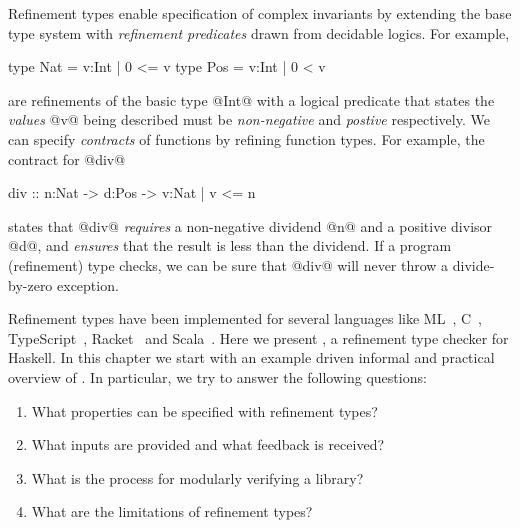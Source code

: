Refinement types enable specification of complex invariants 
by extending the base type system with \emph{refinement predicates} 
drawn from decidable logics. For example,
%
\begin{code}
  type Nat = {v:Int | 0 <= v}
  type Pos = {v:Int | 0 < v}
\end{code}
%
are refinements of the basic type @Int@ with a logical predicate 
that states the \emph{values} @v@ being described must be 
\emph{non-negative} and \emph{postive} respectively. 
%
We can specify \emph{contracts} of functions by refining function types. 
For example, the contract for @div@
%
\begin{code}
  div :: n:Nat -> d:Pos -> {v:Nat | v <= n}
\end{code}
%
states that @div@ \emph{requires} a non-negative dividend @n@ and a positive
divisor @d@, and \emph{ensures} that the result is less than the dividend.
%
If a program (refinement) type checks, we can be sure that @div@ will never 
throw a divide-by-zero exception.

Refinement types \citep{ConstableS87,Rushby98} 
have been implemented for several languages like
ML~\cite{pfenningxi98,GordonTOPLAS2011,LiquidPLDI08},
C~\cite{deputy,LiquidPOPL10},
TypeScript~\cite{Vekris16},
Racket~\cite{RefinedRacket} and Scala~\cite{refinedscala}.
%
Here we present \toolname,
a refinement type checker for Haskell.
%
In this chapter we start with an example driven informal and practical overview
of \toolname.
%
In particular, we try to answer the following questions:
%
\begin{enumerate}
  \item What properties can be specified with refinement types?
  \item What inputs are provided and what feedback is received?
  \item What is the process for modularly verifying a library?
  \item What are the limitations of refinement types? 
\end{enumerate}

